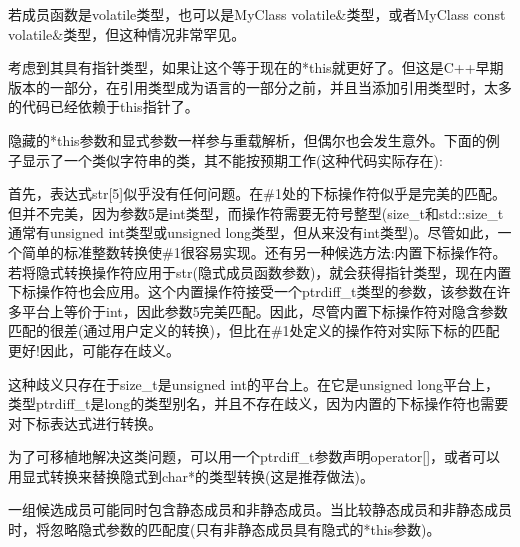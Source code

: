 \begin{notice}
若成员函数是volatile类型，也可以是MyClass volatile\&类型，或者MyClass const volatile\&类型，但这种情况非常罕见。
\end{notice}

考虑到其具有指针类型，如果让这个等于现在的*this就更好了。但这是C++早期版本的一部分，在引用类型成为语言的一部分之前，并且当添加引用类型时，太多的代码已经依赖于this指针了。

隐藏的*this参数和显式参数一样参与重载解析，但偶尔也会发生意外。下面的例子显示了一个类似字符串的类，其不能按预期工作(这种代码实际存在):


首先，表达式str[5]似乎没有任何问题。在\#1处的下标操作符似乎是完美的匹配。但并不完美，因为参数5是int类型，而操作符需要无符号整型(size\_t和std::size\_t通常有unsigned int类型或unsigned long类型，但从来没有int类型)。尽管如此，一个简单的标准整数转换使\#1很容易实现。还有另一种候选方法:内置下标操作符。若将隐式转换操作符应用于str(隐式成员函数参数)，就会获得指针类型，现在内置下标操作符也会应用。这个内置操作符接受一个ptrdiff\_t类型的参数，该参数在许多平台上等价于int，因此参数5完美匹配。因此，尽管内置下标操作符对隐含参数匹配的很差(通过用户定义的转换)，但比在\#1处定义的操作符对实际下标的匹配更好!因此，可能存在歧义。

\begin{notice}
这种歧义只存在于size\_t是unsigned int的平台上。在它是unsigned long平台上，类型ptrdiff\_t是long的类型别名，并且不存在歧义，因为内置的下标操作符也需要对下标表达式进行转换。
\end{notice}

为了可移植地解决这类问题，可以用一个ptrdiff\_t参数声明operator[]，或者可以用显式转换来替换隐式到char*的类型转换(这是推荐做法)。

一组候选成员可能同时包含静态成员和非静态成员。当比较静态成员和非静态成员时，将忽略隐式参数的匹配度(只有非静态成员具有隐式的*this参数)。

